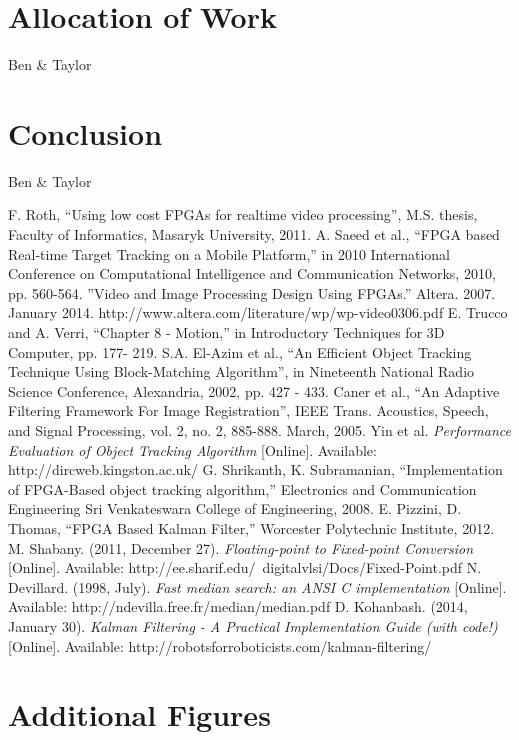 \documentclass[12pt]{article} %
\begin{document}
\section{Allocation of Work}
Ben \& Taylor
\section{Conclusion}
Ben \& Taylor
\newpage
\begin{thebibliography}{11}
F. Roth, “Using low cost FPGAs for realtime video processing”, M.S. thesis, Faculty of Informatics, Masaryk University, 2011.
A. Saeed et al., “FPGA based Real-time Target Tracking on a Mobile Platform,” in 2010 International Conference on Computational Intelligence and Communication Networks, 2010, pp. 560-564.
”Video and Image Processing Design Using FPGAs.” Altera. 2007. January 2014. 
http://www.altera.com/literature/wp/wp-video0306.pdf  
E. Trucco and A. Verri, “Chapter 8 - Motion,” in Introductory Techniques for 3D Computer, pp. 177- 219.
S.A. El-Azim et al., “An Efficient Object Tracking Technique Using Block-Matching Algorithm”, in Nineteenth National Radio Science Conference, Alexandria, 2002, pp. 427 - 433.
Caner et al., “An Adaptive Filtering Framework For Image Registration”, IEEE Trans. Acoustics, Speech, and Signal Processing, vol. 2, no. 2, 885-888. March, 2005. 
Yin et al. \textit{Performance Evaluation of Object Tracking Algorithm} [Online]. Available: http://dircweb.kingston.ac.uk/ 
G. Shrikanth, K. Subramanian, “Implementation of FPGA-Based object tracking algorithm,” Electronics and Communication Engineering Sri Venkateswara College of Engineering, 2008.
E. Pizzini, D. Thomas, “FPGA Based Kalman Filter,” Worcester Polytechnic Institute, 2012.
M. Shabany. (2011, December 27). \textit{Floating-point to Fixed-point Conversion} [Online]. Available: http://ee.sharif.edu/~digitalvlsi/Docs/Fixed-Point.pdf
N. Devillard. (1998, July). \textit{Fast median search: an ANSI C implementation} [Online]. Available: http://ndevilla.free.fr/median/median.pdf
D. Kohanbash. (2014, January 30). \textit{Kalman Filtering - A Practical Implementation Guide (with code!)} [Online]. Available: http://robotsforroboticists.com/kalman-filtering/
\end{thebibliography}
\newpage
\appendix
\appendixpage
\section{Additional Figures} \label{sec:add}
\end{document}
